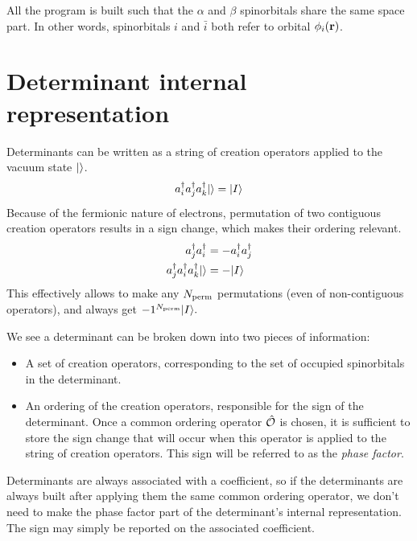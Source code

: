 \documentclass[./thesis.tex]{subfiles}
\begin{document}
All the program is built such that the $\alpha$ and $\beta$ spinorbitals share the same space part. In other words, spinorbitals $i$ and $\bar{i}$ both refer to orbital $\phi_i({\mathbf{r}})$.


\section{Determinant internal representation}
\label{sec:det_representation}

Determinants can be written as a string of creation operators applied to the vacuum state ${\ket{}}$.
\begin{equation}
a^\dagger_{i} a^\dagger_{j} a^\dagger_{k} {\ket{}} = {\ket{I}}
\end{equation}
Because of the fermionic nature of electrons, permutation of two contiguous creation operators results in a sign change, which makes their ordering relevant.
\begin{align}
a^\dagger_{j} a^\dagger_{i} & = -a^\dagger_{i} a^\dagger_{j} \\
a^\dagger_{j} a^\dagger_{i} a^\dagger_{k} {\ket{}} &=  -{\ket{I}}
\end{align}
This effectively allows to make any ${N_\text{perm}}$ permutations (even of non-contiguous operators), and always get $-1^{{N_\text{perm}}} {\ket{I}}.$

We see a determinant can be broken down into two pieces of information:
\begin{itemize}
\item
A set of creation operators, corresponding to the set of occupied spinorbitals in the determinant.
\item
An ordering of the creation operators, responsible for the sign of the determinant. Once a common ordering operator ${\hat{\mathcal{O}}}$ is chosen, it is sufficient to store the sign change that will occur when this operator is applied to the string of creation operators. This sign will be referred to as the \emph{phase factor}.
\end{itemize}
Determinants are always associated with a coefficient, so
if the determinants are always built after applying them the same common ordering operator,
we don't need to make the phase factor part of the determinant's internal representation. The sign may simply be reported on the associated coefficient.
\end{document}
